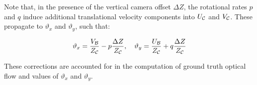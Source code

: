Note that, in the presence of the vertical camera offset $\Delta Z$, the rotational rates $p$ and $q$ induce additional translational velocity components into $U_{\cal C}$ and $V_{\cal C}$. These propagate to $\vartheta_x$ and $\vartheta_y$, such that:

\begin{equation}
\vartheta_x = \frac{V_{\cal B}}{Z_{\cal C}} - p\frac{\Delta Z}{Z_{\cal C}},\quad \vartheta_y = \frac{U_{\cal B}}{Z_{\cal C}} + q\frac{\Delta Z}{Z_{\cal C}}
\end{equation}

These corrections are accounted for in the computation of ground truth optical flow and values of $\vartheta_x$ and $\vartheta_y$.

%
%
%
%
%


%
%


